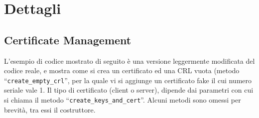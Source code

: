\section{Dettagli}

\subsection{Certificate Management}
L'esempio di codice mostrato di seguito è una versione leggermente modificata del codice reale,
e mostra come si crea un certificato ed una CRL vuota (metodo
``\texttt{create\_empty\_crl}'', per la quale vi
si aggiunge un certificato fake il cui numero seriale vale 1.
Il tipo di certificato (client o server), dipende dai parametri con cui si chiama il metodo
``\texttt{create\_keys\_and\_cert}''.
Alcuni metodi sono omessi per brevità, tra essi il costruttore.
